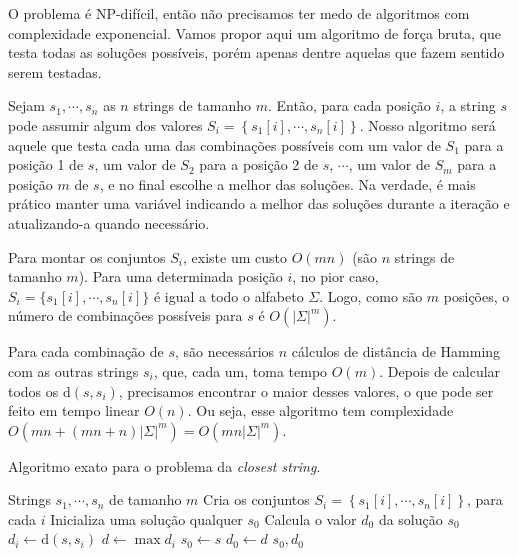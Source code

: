 O problema é NP-difícil, então não precisamos ter medo de algoritmos com complexidade exponencial. Vamos propor aqui um algoritmo de força bruta, que testa todas as soluções possíveis, porém apenas dentre aquelas que fazem sentido serem testadas.

Sejam $s_1, \cdots, s_n$ as $n$ strings de tamanho $m$. Então, para cada posição $i$, a string $s$ pode assumir algum dos valores $S_i = \left\{s_1[i], \cdots, s_n[i]\right\}$. Nosso algoritmo será aquele que testa cada uma das combinações possíveis com um valor de $S_1$ para a posição 1 de $s$, um valor de $S_2$ para a posição 2 de $s$, $\cdots$, um valor de $S_m$ para a posição $m$ de $s$, e no final escolhe a melhor das soluções. Na verdade, é mais prático manter uma variável indicando a melhor das soluções durante a iteração e atualizando-a quando necessário.

Para montar os conjuntos $S_i$, existe um custo $O(mn)$ (são $n$ strings de tamanho $m$). Para uma determinada posição $i$, no pior caso, $S_i = \{s_1[i], \cdots, s_n[i]\}$ é igual a todo o alfabeto $\Sigma$. Logo, como são $m$ posições, o número de combinações possíveis para $s$ é $O(|\Sigma|^m)$.

Para cada combinação de $s$, são necessários $n$ cálculos de distância de Hamming com as outras strings $s_i$, que, cada um, toma tempo $O(m)$.
Depois de calcular todos os $\text{d}(s, s_i)$, precisamos encontrar o maior desses valores, o que pode ser feito em tempo linear $O(n)$.
Ou seja, esse algoritmo tem complexidade $O(mn + (mn+n)|\Sigma|^m) = O(mn|\Sigma|^m)$.

\begin{algorithm}
    \caption{Algoritmo exato para o problema da \textit{closest string}.}
    \label{alg:exact}
    \begin{algorithmic}
        \Require Strings $s_1, \cdots, s_n$ de tamanho $m$
        \State Cria os conjuntos $S_i = \left\{s_1[i], \cdots, s_n[i]\right\}$, para cada $i$
        \State Inicializa uma solução qualquer $s_0$
        \State Calcula o valor $d_0$ da solução $s_0$
                \State $d_i \gets \text{d}(s, s_i)$
            \EndFor
            \State $d \gets \max d_i$
                \State $s_0 \gets s$
                \State $d_0 \gets d$
            \EndIf
        \EndFor
        \State \Return $s_0, d_0$
    \end{algorithmic}
\end{algorithm}
